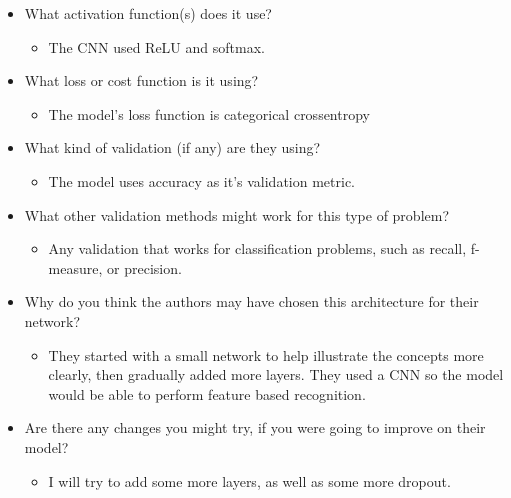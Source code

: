 \documentclass[letterpaper]{article}
\begin{document}
\begin{itemize}
\item What activation function(s) does it use?

\begin{itemize}
\item The CNN used ReLU and softmax.
\end{itemize}

\item What loss or cost function is it using?

\begin{itemize}
\item The model's loss function is categorical crossentropy
\end{itemize}

\item What kind of validation (if any) are they using?

\begin{itemize}
\item The model uses accuracy as it's validation metric.
\end{itemize}

\item What other validation methods might work for this type of problem?

\begin{itemize}
\item Any validation that works for classification problems, such as
recall, f-measure, or precision.
\end{itemize}

\item Why do you think the authors may have chosen this architecture for
their network?

\begin{itemize}
\item They started with a small network to help illustrate the concepts
more clearly, then gradually added more layers. They used a CNN so
the model would be able to perform feature based recognition.
\end{itemize}

\item Are there any changes you might try, if you were going to improve on
their model?

\begin{itemize}
\item I will try to add some more layers, as well as some more dropout.
\end{itemize}
\end{itemize}
\end{document}
